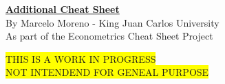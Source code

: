 \documentclass[10pt, a4paper, landscape]{extarticle}
\begin{document}
\setlength{\footskip}{12pt}

\begin{multicols}{3} %

\begin{center}
	\textbf{\LARGE \href{https://github.com/marcelomijas/econometrics-cheatsheet}{Additional Cheat Sheet}}
	\\ {\footnotesize By Marcelo Moreno - King Juan Carlos University}
	\\ {\footnotesize As part of the Econometrics Cheat Sheet Project}
\end{center}

\colorbox{yellow}{THIS IS A WORK IN PROGRESS}
\\ \colorbox{yellow}{NOT INTENDEND FOR GENEAL PURPOSE}


\end{multicols}
\end{document}
